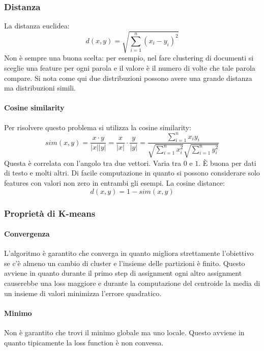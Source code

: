 \subsubsection{Distanza}
La distanza euclidea:
$$d(x,y) = \sqrt{\sum\limits_{i=1}^n(x_i-y_i)^2}$$
Non \`e sempre una buona scelta: per esempio, nel fare clustering di documenti si sceglie una feature per ogni parola e il valore \`e il numero di volte che tale parola compare.
Si nota come qui due distribuzioni possono avere una grande distanza ma distribuzioni simili.

\paragraph{Cosine similarity}
Per risolvere questo problema si utilizza la cosine similarity:
$$sim(x,y) = \frac{x\cdot y}{|x||y|} = \frac{x}{|x|}\cdot\frac{y}{|y|} = \frac{\sum\limits_{i = 1}^n x_iy_i}{\sqrt{\sum\limits_{i = 1}^n x_i^2}\sqrt{\sum\limits_{i = 1}^ny_i^2}}$$
Questa \`e correlata con l'angolo tra due vettori.
Varia tra $0$ e $1$.
\`E buona per dati di testo e molti altri.
Di facile computazione in quanto si possono considerare solo features con valori non zero in entrambi gli esempi.
La cosine distance:
$$d(x,y) = 1-sim(x,y)$$

\subsubsection{Propriet\`a di K-means}

\paragraph{Convergenza}
L'algoritmo \`e garantito che converga in quanto migliora strettamente l'obiettivo se c'\`e almeno un cambio di cluster e l'insieme delle partizioni \`e finito.
Questo avviene in quanto durante il primo step di assignment ogni altro assignment causerebbe una loss maggiore e durante la computazione del centroide la media di un insieme di valori minimizza l'errore quadratico.

\paragraph{Minimo}
Non \`e garantito che trovi il minimo globale ma uno locale.
Questo avviene in quanto tipicamente la loss function \`e non convessa.

